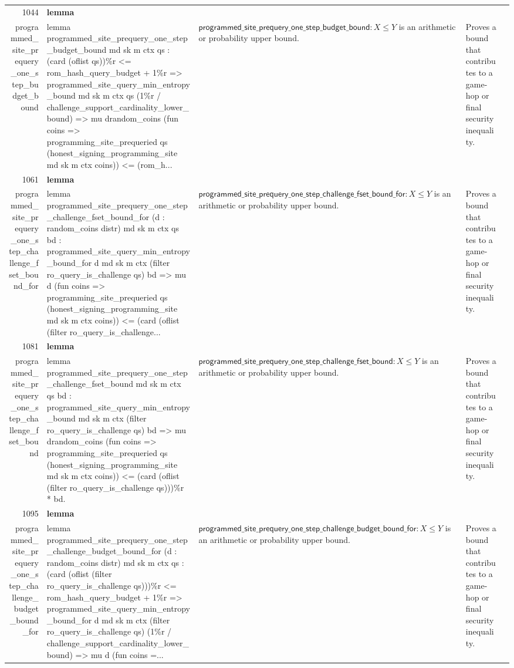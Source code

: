 \documentclass[10pt]{article}
\newcommand{\ec}[1]{\begingroup\ttfamily\scriptsize #1\endgroup}
\begin{document}
\begin{longtable}{r L{0.17\textwidth} L{0.26\textwidth} L{0.27\textwidth} L{0.20\textwidth}}
1044 & \textbf{lemma}\\\ec{programmed\_site\_prequery\_one\_step\_budget\_bound} & \ec{lemma programmed\_site\_prequery\_one\_step\_budget\_bound md sk m ctx qs : (card (oflist qs))\%r <= rom\_hash\_query\_budget + 1\%r => programmed\_site\_query\_min\_entropy\_bound md sk m ctx qs (1\%r / challenge\_support\_cardinality\_lower\_bound) => mu drandom\_coins (fun coins => programming\_site\_prequeried qs (honest\_signing\_programming\_site md sk m ctx coins)) <= (rom\_h...} & \(\mathsf{programmed\_site\_prequery\_one\_step\_budget\_bound} : X \le Y\) is an arithmetic or probability upper bound. & Proves a bound that contributes to a game-hop or final security inequality. \\
1061 & \textbf{lemma}\\\ec{programmed\_site\_prequery\_one\_step\_challenge\_fset\_bound\_for} & \ec{lemma programmed\_site\_prequery\_one\_step\_challenge\_fset\_bound\_for (d : random\_coins distr) md sk m ctx qs bd : programmed\_site\_query\_min\_entropy\_bound\_for d md sk m ctx (filter ro\_query\_is\_challenge qs) bd => mu d (fun coins => programming\_site\_prequeried qs (honest\_signing\_programming\_site md sk m ctx coins)) <= (card (oflist (filter ro\_query\_is\_challenge...} & \(\mathsf{programmed\_site\_prequery\_one\_step\_challenge\_fset\_bound\_for} : X \le Y\) is an arithmetic or probability upper bound. & Proves a bound that contributes to a game-hop or final security inequality. \\
1081 & \textbf{lemma}\\\ec{programmed\_site\_prequery\_one\_step\_challenge\_fset\_bound} & \ec{lemma programmed\_site\_prequery\_one\_step\_challenge\_fset\_bound md sk m ctx qs bd : programmed\_site\_query\_min\_entropy\_bound md sk m ctx (filter ro\_query\_is\_challenge qs) bd => mu drandom\_coins (fun coins => programming\_site\_prequeried qs (honest\_signing\_programming\_site md sk m ctx coins)) <= (card (oflist (filter ro\_query\_is\_challenge qs)))\%r * bd.} & \(\mathsf{programmed\_site\_prequery\_one\_step\_challenge\_fset\_bound} : X \le Y\) is an arithmetic or probability upper bound. & Proves a bound that contributes to a game-hop or final security inequality. \\
1095 & \textbf{lemma}\\\ec{programmed\_site\_prequery\_one\_step\_challenge\_budget\_bound\_for} & \ec{lemma programmed\_site\_prequery\_one\_step\_challenge\_budget\_bound\_for (d : random\_coins distr) md sk m ctx qs : (card (oflist (filter ro\_query\_is\_challenge qs)))\%r <= rom\_hash\_query\_budget + 1\%r => programmed\_site\_query\_min\_entropy\_bound\_for d md sk m ctx (filter ro\_query\_is\_challenge qs) (1\%r / challenge\_support\_cardinality\_lower\_bound) => mu d (fun coins =...} & \(\mathsf{programmed\_site\_prequery\_one\_step\_challenge\_budget\_bound\_for} : X \le Y\) is an arithmetic or probability upper bound. & Proves a bound that contributes to a game-hop or final security inequality. \\

\end{longtable}
\end{document}
